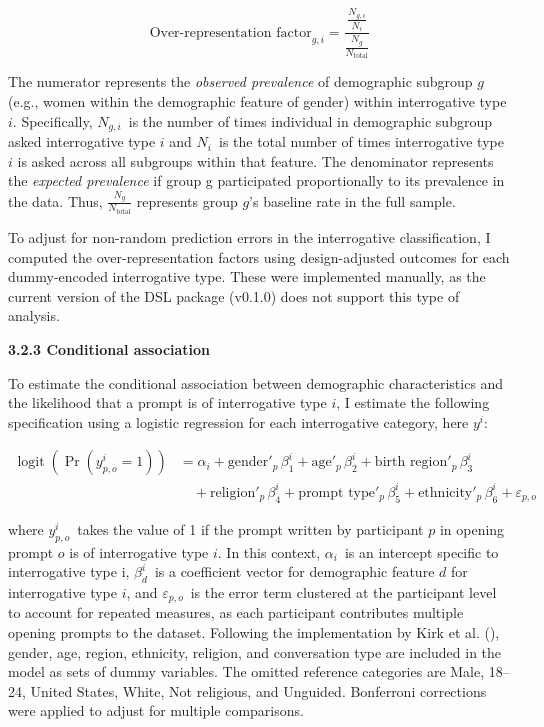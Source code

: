 \documentclass[
  12pt,
]{article}
\begin{document}
\[ 
\text{Over-representation factor}_{g,i} = \frac{\frac{N_{g,i}}{N_i}}{\frac{N_g}{N_{\text{total}}}} 
\]

The numerator represents the \emph{observed prevalence} of demographic subgroup \(g\) (e.g., women within the demographic feature of gender) within interrogative type \(i\). Specifically, \(N_{g,i}\)~is the number of times individual in demographic subgroup asked interrogative type \(i\) and \({N_i}\)~is the total number of times interrogative type \(i\) is asked across all subgroups within that feature. The denominator represents the \emph{expected prevalence} if group g participated proportionally to its prevalence in the data. Thus, \(\frac{N_g}{N_{\text{total}}}\) represents group \(g\)'s baseline rate in the full sample.

To adjust for non-random prediction errors in the interrogative classification, I computed the over-representation factors using design-adjusted outcomes for each dummy-encoded interrogative type. These were implemented manually, as the current version of the DSL package (v0.1.0) does not support this type of analysis.

\textbf{3.2.3 Conditional association}

To estimate the conditional association between demographic characteristics and the likelihood that a prompt is of interrogative type \(i\), I estimate the following specification using a logistic regression for each interrogative category, here \(y^{i}\):

\[
\begin{aligned}
\operatorname{logit}\left(\Pr\left(y^{i}_{p,o} = 1\right)\right)
&= \alpha_i
+ \text{gender}'_{p} \, \beta^{i}_{1}
+ \text{age}'_{p} \, \beta^{i}_{2}
+ \text{birth region}'_{p} \, \beta^{i}_{3} \\
&\quad + \text{religion}'_{p} \, \beta^{i}_{4}
+ \text{prompt type}'_{p} \, \beta^{i}_{5}
+ \text{ethnicity}'_{p} \, \beta^{i}_{6}
+ \varepsilon_{p,o}
\end{aligned}
\]

where \(y_{p,o}^{i}\)~takes the value of 1 if the prompt written by participant \(p\) in opening prompt \(o\) is of interrogative type \(i\). In this context, \(\alpha_{i}\)~is an intercept specific to interrogative type i, \(\beta_{d}^{i}\)~is a coefficient vector for demographic feature \(d\) for interrogative type \(i\), and \(\varepsilon_{p,o}\)~is the error term clustered at the participant level to account for repeated measures, as each participant contributes multiple opening prompts to the dataset. Following the implementation by Kirk et al. (), gender, age, region, ethnicity, religion, and conversation type are included in the model as sets of dummy variables. The omitted reference categories are Male, 18--24, United States, White, Not religious, and Unguided. Bonferroni corrections were applied to adjust for multiple comparisons.
\end{document}
